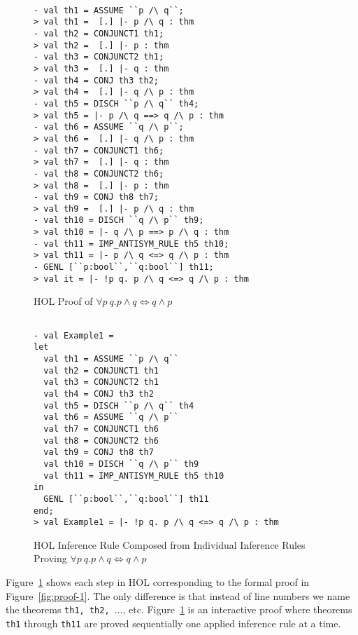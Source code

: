 \begin{figure}[t]
  \centering
  \begin{session}
\begin{verbatim}

- val th1 = ASSUME ``p /\ q``;
> val th1 =  [.] |- p /\ q : thm
- val th2 = CONJUNCT1 th1;
> val th2 =  [.] |- p : thm
- val th3 = CONJUNCT2 th1;
> val th3 =  [.] |- q : thm
- val th4 = CONJ th3 th2;
> val th4 =  [.] |- q /\ p : thm
- val th5 = DISCH ``p /\ q`` th4;
> val th5 = |- p /\ q ==> q /\ p : thm
- val th6 = ASSUME ``q /\ p``;
> val th6 =  [.] |- q /\ p : thm
- val th7 = CONJUNCT1 th6;
> val th7 =  [.] |- q : thm
- val th8 = CONJUNCT2 th6;
> val th8 =  [.] |- p : thm
- val th9 = CONJ th8 th7;
> val th9 =  [.] |- p /\ q : thm
- val th10 = DISCH ``q /\ p`` th9;
> val th10 = |- q /\ p ==> p /\ q : thm
- val th11 = IMP_ANTISYM_RULE th5 th10;
> val th11 = |- p /\ q <=> q /\ p : thm
- GENL [``p:bool``,``q:bool``] th11;
> val it = |- !p q. p /\ q <=> q /\ p : thm
\end{verbatim}
  \end{session}
  \caption{HOL Proof of $\forall p\:q.p \wedge q \Leftrightarrow q \wedge p$}
\label{fig:hol-proof-1}
\end{figure}

\begin{figure}[t]
  \centering
  \begin{session}
\begin{verbatim}

- val Example1 =
let
  val th1 = ASSUME ``p /\ q``
  val th2 = CONJUNCT1 th1
  val th3 = CONJUNCT2 th1
  val th4 = CONJ th3 th2
  val th5 = DISCH ``p /\ q`` th4
  val th6 = ASSUME ``q /\ p``
  val th7 = CONJUNCT1 th6
  val th8 = CONJUNCT2 th6
  val th9 = CONJ th8 th7
  val th10 = DISCH ``q /\ p`` th9
  val th11 = IMP_ANTISYM_RULE th5 th10
in
  GENL [``p:bool``,``q:bool``] th11
end;
> val Example1 = |- !p q. p /\ q <=> q /\ p : thm
\end{verbatim}
  \end{session}
  \caption{HOL Inference Rule Composed from Individual Inference Rules
    Proving $\forall p\:q.p \wedge q \Leftrightarrow q \wedge p$}
\label{fig:hol-proof-2}
\end{figure}

Figure~\ref{fig:hol-proof-1} shows each step in HOL corresponding to
the formal proof in Figure~\ref{fig:proof-1}. The only difference is
that instead of line numbers we name the theorems \texttt{th1, th2,
  $\ldots$}, etc. Figure~\ref{fig:hol-proof-1} is an interactive proof
where theorems \texttt{th1} through \texttt{th11} are proved
sequentially one applied inference rule at a time.

